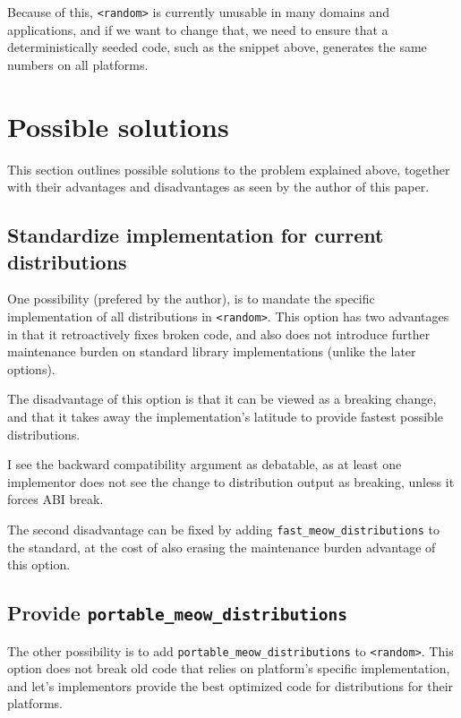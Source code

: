 \documentclass{wg21}
\begin{document}
Because of this, \texttt{<random>} is currently unusable in many
domains and applications, and if we want to change that, we need
to ensure that a deterministically seeded code, such as the snippet
above, generates the same numbers on all platforms.


\hypertarget{possible-solutions}{%
    \section{Possible solutions}\label{possible-solutions}}

This section outlines possible solutions to the problem explained above,
together with their advantages and disadvantages as seen by the author of
this paper.

\hypertarget{standardize-implementation}{%
    \subsection{Standardize implementation for current distributions}\label{possible-solutions}}

One possibility (prefered by the author), is to mandate the specific
implementation of all distributions in \texttt{<random>}. This option
has two advantages in that it retroactively fixes broken code, and
also does not introduce further maintenance burden on standard library
implementations (unlike the later options).

The disadvantage of this option is that it can be viewed as a breaking
change, and that it takes away the implementation's latitude to provide
fastest possible distributions.

I see the backward compatibility argument as debatable, as at least one
implementor does not see the change to distribution output as breaking,
unless it forces ABI break\cite{msvc-github}.

The second disadvantage can be fixed by adding \texttt{fast_meow_distributions}
to the standard, at the cost of also erasing the maintenance burden advantage
of this option.


\hypertarget{portable-overloads}{%
    \subsection{Provide \texttt{portable_meow_distributions}}\label{portable-overloads}}

The other possibility is to add \texttt{portable_meow_distributions}
to \texttt{<random>}. This option does not break old code that relies
on platform's specific implementation, and let's implementors provide
the best optimized code for distributions for their platforms.
\end{document}

